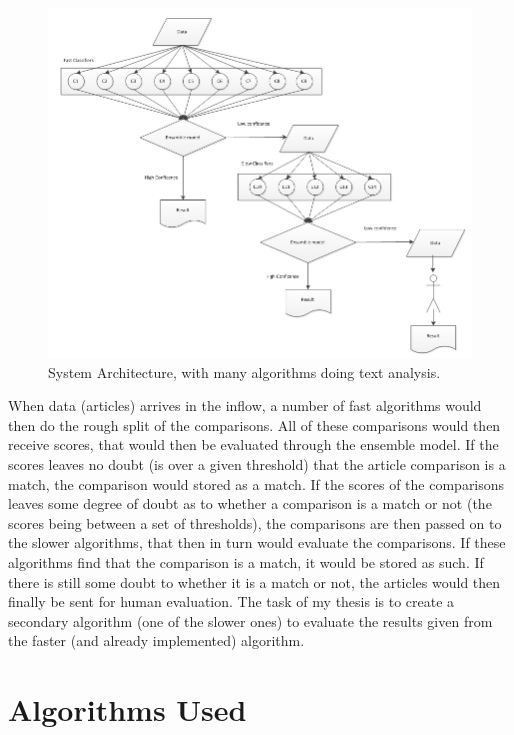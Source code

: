 \begin{figure}[h]
	\centering
	\includegraphics[scale=0.5]{figures/SystemArchitecture}
	\caption{System Architecture, with many algorithms doing text analysis\cite{Slides}.}
	\label{Architecture}
\end{figure}

When data (articles) arrives in the inflow, a number of fast algorithms would then do the rough split of the comparisons. All of these comparisons would then receive scores, that would then be evaluated through the ensemble model. If the scores leaves no doubt (is over a given threshold) that the article comparison is a match, the comparison would stored as a match. If the scores of the comparisons leaves some degree of doubt as to whether a comparison is a match or not (the scores being between a set of thresholds), the comparisons are then passed on to the slower algorithms, that then in turn would evaluate the comparisons. If these algorithms find that the comparison is a match, it would be stored as such. If there is still some doubt to whether it is a match or not, the articles would then finally be sent for human evaluation. 
The task of my thesis is to create a secondary algorithm (one of the slower ones) to evaluate the results given from the faster (and already implemented) algorithm.

\section{Algorithms Used}

